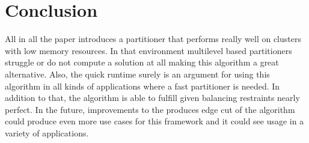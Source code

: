 \documentclass[acmsmall,nonacm,screen,review]{acmart}
\begin{document}
\section{Conclusion}
All in all the paper introduces a partitioner that performs really well on clusters with low memory resources. In that environment multilevel based partitioners struggle or do not compute a solution at all making this algorithm a great alternative. Also, the quick runtime surely is an argument for using this algorithm in all kinds of applications where a fast partitioner is needed. In addition to that, the algorithm is able to fulfill given balancing restraints nearly perfect. In the future, improvements to the produces edge cut of the algorithm could produce even more use cases for this framework and it could see usage in a variety of applications.


\end{document}
